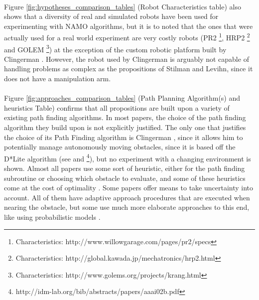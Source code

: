\paragraph{} Figure \ref{fig:hypotheses_comparison_tables} (Robot Characteristics table) also shows that a diversity of real and simulated robots have been used for experimenting with NAMO algorithms, but it is to noted that the ones that were actually used for a real world experiment are very costly robots (PR2 \footnote{Characteristics: http://www.willowgarage.com/pages/pr2/specs}, HRP2 \footnote{Characteristics: http://global.kawada.jp/mechatronics/hrp2.html} and GOLEM \footnote{Characteristics: http://www.golems.org/projects/krang.html}) at the exception of the custom robotic platform built by Clingerman \parencite{clingerman_estimating_2014}. However, the robot used by Clingerman is arguably not capable of handling problems as complex as the propositions of Stilman and Levihn, since it does not have a manipulation arm.

\paragraph{} Figure \ref{fig:approaches_comparison_tables} (Path Planning Algorithm(s) and heuristics Table) confirms that all propositions are built upon a variety of existing path finding algorithms. In most papers, the choice of the path finding algorithm they build upon is not explicitly justified. The only one that justifies the choice of its Path Finding algorithm is Clingerman \parencite{clingerman_dynamic_2015}, since it allows him to potentially manage autonomously moving obstacles, since it is based off the D*Lite algorithm (see \parencite{koenig_fast_2005} and \footnote{http://idm-lab.org/bib/abstracts/papers/aaai02b.pdf}), but no experiment with a changing environment is shown. Almost all papers use some sort of heuristic, either for the path finding subroutine or choosing which obstacle to evaluate, and some of these heuristics come at the cost of optimality \parencite{stilman_navigation_2005, wu_navigation_2010}. Some papers \parencite{stilman_planning_2007, levihn_foresight_2013, levihn_planning_2013, clingerman_estimating_2014, clingerman_dynamic_2015, scholz_navigation_2016} offer means to take uncertainty into account. All of them have adaptive approach procedures that are executed when nearing the obstacle, but some use much more elaborate approaches to this end, like using probabilistic models \parencite{levihn_planning_2013, scholz_navigation_2016}.

